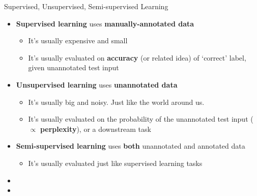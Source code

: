 \documentclass[xcolor=pdftex,x11names,table,hyperref]{beamer}
\begin{document}
\begin{frame}{Supervised, Unsupervised, Semi-supervised Learning}
\begin{itemize}
	\item \small{\textbf{Supervised learning} uses \textbf{manually-annotated data}} \hfill
	\begin{itemize}
		\pause
		\item It's usually expensive and small
		\pause
		\item It's usually evaluated on \textbf{accuracy} (or related idea) of `correct' label, given unannotated test input
	\end{itemize}
	\pause
	\item \textbf{Unsupervised learning} uses \textbf{unannotated data} \hfill
	\begin{itemize}
		\pause
		\item It's usually big and noisy. Just like the world around us.
		\pause
		\item It's usually evaluated on the probability of the unannotated test input ($\propto$ \textbf{perplexity}), or a downstream task
	\end{itemize}
	\pause
	\item \textbf{Semi-supervised learning} uses \textbf{both} unannotated and annotated data
	\begin{itemize}
		\item It's usually evaluated just like supervised learning tasks
	\end{itemize}
\end{itemize}
\end{frame}

\begin{frame}{}
\begin{itemize}
	\item 
	\item 
\end{itemize}
\end{frame}
\end{document}

